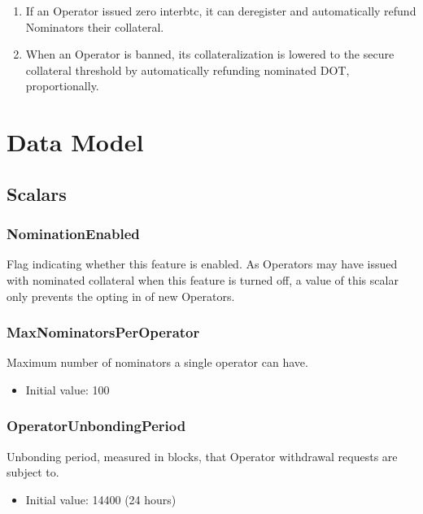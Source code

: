 \documentclass[a4paper,10pt,english]{sphinxmanual}
\begin{document}
\begin{enumerate}
\item {} 
If an Operator issued zero interbtc, it can deregister and automatically refund Nominators their collateral.

\item {} 
When an Operator is banned, its collateralization is lowered to the secure collateral threshold by automatically refunding nominated DOT, proportionally.

\end{enumerate}


\section{Data Model}
\label{\detokenize{spec/nomination:data-model}}

\subsection{Scalars}
\label{\detokenize{spec/nomination:scalars}}

\subsubsection{NominationEnabled}
\label{\detokenize{spec/nomination:nominationenabled}}
Flag indicating whether this feature is enabled.
As Operators may have issued  with nominated collateral when this feature is turned off,
a  value of this scalar only prevents the opting in of new Operators.


\subsubsection{MaxNominatorsPerOperator}
\label{\detokenize{spec/nomination:maxnominatorsperoperator}}
Maximum number of nominators a single operator can have.
\begin{itemize}
\item {} 
Initial value: 100

\end{itemize}


\subsubsection{OperatorUnbondingPeriod}
\label{\detokenize{spec/nomination:operatorunbondingperiod}}
Unbonding period, measured in blocks, that Operator withdrawal requests are subject to.
\begin{itemize}
\item {} 
Initial value: 14400 (24 hours)

\end{itemize}
\end{document}
